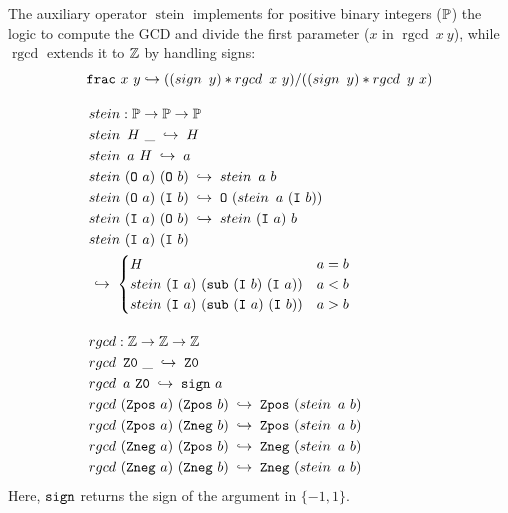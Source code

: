 \begin{definition}\label{def:frac}
The auxiliary operator $\mathop{stein}$ implements for positive binary integers ($\mathbb{P}$) the logic to compute the GCD and divide the first parameter ($x$ in $\mathop{rgcd}~x~y$), while $\mathop{rgcd}$ extends it to $\mathbb{Z}$ by handling signs:
\begin{align*}
&\texttt{\upshape{frac}}~x~y \hookrightarrow ((\mathop{sign}~y) * \mathop{rgcd}~x~y) \slash ((\mathop{sign}~y) * \mathop{rgcd}~y~x) \\[1em]
& \mathop{stein}: \mathbb{P} \rightarrow \mathbb{P} \rightarrow \mathbb{P} \\
& \mathop{stein}~H~\_ \;\hookrightarrow\; H \\
& \mathop{stein}~a~H \;\hookrightarrow\; a \\
& \mathop{stein}~(\texttt{\upshape{O}}~a)~(\texttt{\upshape{O}}~b) 
   \;\hookrightarrow\; \mathop{stein}~a~b \\
& \mathop{stein}~(\texttt{\upshape{O}}~a)~(\texttt{\upshape{I}}~b) 
   \;\hookrightarrow\; \texttt{\upshape{O}}~(\mathop{stein}~a~(\texttt{\upshape{I}}~b)) \\
& \mathop{stein}~(\texttt{\upshape{I}}~a)~(\texttt{\upshape{O}}~b) 
   \;\hookrightarrow\; \mathop{stein}~(\texttt{\upshape{I}}~a)~b \\
& \mathop{stein}~(\texttt{\upshape{I}}~a)~(\texttt{\upshape{I}}~b) \\
&   \;\hookrightarrow\; \begin{cases}
       H & a = b \\
       \mathop{stein}~(\texttt{\upshape{I}}~a)~(\texttt{\upshape{sub}}~(\texttt{\upshape{I}}~b)~(\texttt{\upshape{I}}~a)) & a < b \\
       \mathop{stein}~(\texttt{\upshape{I}}~a)~(\texttt{\upshape{sub}}~(\texttt{\upshape{I}}~a)~(\texttt{\upshape{I}}~b)) &  a > b
     \end{cases} \\[1em]
& \mathop{rgcd}: \mathbb{Z} \rightarrow \mathbb{Z} \rightarrow \mathbb{Z} \\
& \mathop{rgcd}~\texttt{\upshape{Z0}}~\_ \;\hookrightarrow\; \texttt{\upshape{Z0}} \\
& \mathop{rgcd}~a~\texttt{\upshape{Z0}} \;\hookrightarrow\; \texttt{\upshape{sign}}~a \\
& \mathop{rgcd}~(\texttt{\upshape{Zpos}}~a)~(\texttt{\upshape{Zpos}}~b) 
  \;\hookrightarrow\; \texttt{\upshape{Zpos}}~(\mathop{stein}~a~b) \\
& \mathop{rgcd}~(\texttt{\upshape{Zpos}}~a)~(\texttt{\upshape{Zneg}}~b) 
  \;\hookrightarrow\; \texttt{\upshape{Zpos}}~(\mathop{stein}~a~b) \\
& \mathop{rgcd}~(\texttt{\upshape{Zneg}}~a)~(\texttt{\upshape{Zpos}}~b) 
  \;\hookrightarrow\; \texttt{\upshape{Zneg}}~(\mathop{stein}~a~b) \\
& \mathop{rgcd}~(\texttt{\upshape{Zneg}}~a)~(\texttt{\upshape{Zneg}}~b) 
  \;\hookrightarrow\; \texttt{\upshape{Zneg}}~(\mathop{stein}~a~b)
\end{align*}
Here, $\texttt{\upshape{sign}}$ returns the sign of the argument in $\{-1, 1\}$.
\end{definition}

